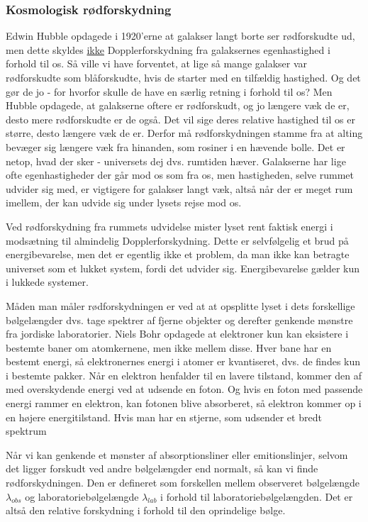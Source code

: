 \documentclass[a4paper]{article}
\begin{document}
\subsubsection{Kosmologisk rødforskydning}
Edwin Hubble opdagede i 1920'erne at galakser langt borte ser rødforskudte ud, men dette skyldes \underline{ikke} Dopplerforskydning fra galaksernes egenhastighed i forhold til os. Så ville vi have forventet, at lige så mange galakser var rødforskudte som blåforskudte, hvis de starter med en tilfældig hastighed. Og det gør de jo - for hvorfor skulle de have en særlig retning i forhold til os? Men Hubble opdagede, at galakserne oftere er rødforskudt, og jo længere væk de er, desto mere rødforskudte er de også. Det vil sige deres relative hastighed til os er større, desto længere væk de er. Derfor må rødforskydningen stamme fra at alting bevæger sig længere væk fra hinanden, som rosiner i en hævende bolle. Det er netop, hvad der sker - universets dej dvs. rumtiden hæver. Galakserne har lige ofte egenhastigheder der går mod os som fra os, men hastigheden, selve rummet udvider sig med, er vigtigere for galakser langt væk, altså når der er meget rum imellem, der kan udvide sig under lysets rejse mod os. 

Ved rødforskydning fra rummets udvidelse mister lyset rent faktisk energi i modsætning til almindelig Dopplerforskydning. Dette er selvfølgelig et brud på energibevarelse, men det er egentlig ikke et problem, da man ikke kan betragte universet som et lukket system, fordi det udvider sig. Energibevarelse gælder kun i lukkede systemer. \cite{Davis}

Måden man måler rødforskydningen er ved at at opsplitte lyset i dets forskellige bølgelængder dvs. tage spektrer af fjerne objekter og derefter genkende mønstre fra jordiske laboratorier. Niels Bohr opdagede at elektroner kun kan eksistere i bestemte baner om atomkernene, men ikke mellem disse. Hver bane har en bestemt energi, så elektronernes energi i atomer er kvantiseret, dvs. de findes kun i bestemte pakker. Når en elektron henfalder til en lavere tilstand, kommer den af med overskydende energi ved at udsende en foton. Og hvis en foton med passende energi rammer en elektron, kan fotonen blive absorberet, så elektron kommer op i en højere energitilstand. Hvis man har en stjerne, som udsender et bredt spektrum


Når vi kan genkende et mønster af absorptionsliner eller emitionslinjer, selvom det ligger forskudt ved andre bølgelængder end normalt, så kan vi finde rødforskydningen. Den er defineret som forskellen mellem observeret bølgelængde $\lambda_{obs}$ og laboratoriebølgelængde $\lambda_{lab}$ i forhold til laboratoriebølgelængden. Det er altså den relative forskydning i forhold til den oprindelige bølge.
\end{document}
